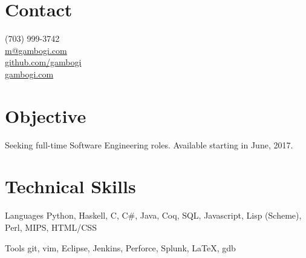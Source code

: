 \documentclass[letter,margin,line]{resume}
\begin{document}
    \begin{resume}
        \section{\mysidestyle Contact} \vspace{2mm}

        \begin{multicols}{3}
                  (703) 999-3742 \\
            \columnbreak
                  \href{mailto:m@gambogi.com}{m@gambogi.com} \\
            \columnbreak
                  \href{https://github.com/gambogi}{github.com/gambogi}\\
                  \href{http://gambogi.com}{gambogi.com}
        \end{multicols}

        \section{\mysidestyle Objective}
            Seeking full-time Software Engineering roles.
            Available starting in June, 2017.

        \section{\mysidestyle Technical Skills}
        \begin{compactdesc}
        \item[Languages] { \small
                 Python,
                 Haskell,
                 C,
                 C\#,
                 Java,
                 Coq,
                 SQL,
                 Javascript,
                 Lisp (Scheme),
                 Perl,
                 MIPS,
                 HTML/CSS
            }
        \item[Tools] { \small
                git,
                vim,
                Eclipse,
                Jenkins,
                Perforce,
                Splunk,
                \LaTeX,
                gdb
            }
        \end{compactdesc}


\end{resume}
\end{document}
